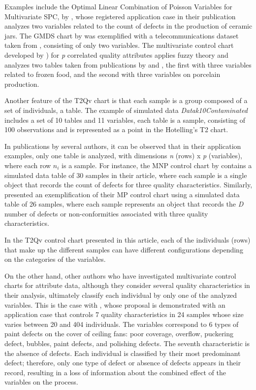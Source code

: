 \documentclass[mathematics,article,submit,moreauthors,pdftex]{mdpi}
\begin{document}
Examples include the Optimal Linear Combination of Poisson Variables for
Multivariate SPC, by \citet{epprecht2013optimal}, whose registered
application case in their publication analyzes two variables related to
the count of defects in the production of ceramic jars. The GMDS chart
by \citet{raza2019design} was exemplified with a telecommunications
dataset taken from \citet{jiang2002process}, consisting of only two
variables. The multivariate control chart developed by
\citet{pastuizaca2015multivariate}) for \emph{p} correlated quality
attributes applies fuzzy theory and analyzes two tables taken from
publications by \citet{taleb2009control} and
\citet{taleb2006multivariate}, the first with three variables related to
frozen food, and the second with three variables on porcelain
production.

Another feature of the T2Qv chart is that each sample is a group
composed of a set of individuals, a table. The example of simulated data
\emph{Datak10Contaminated} includes a set of 10 tables and 11 variables,
each table is a sample, consisting of 100 observations and is
represented as a point in the Hotelling's T2 chart.

In publications by several authors, it can be observed that in their
application examples, only one table is analyzed, with dimensions
\emph{n} (rows) x \emph{p} (variables), where each row \(n_i\) is a
sample. For instance, the MNP control chart by \citet{lu1998control}
contains a simulated data table of 30 samples in their article, where
each sample is a single object that records the count of defects for
three quality characteristics. Similarly, \citet{chiu2007} presented an
exemplification of their MP control chart using a simulated data table
of 26 samples, where each sample represents an object that records the
\emph{D} number of defects or non-conformities associated with three
quality characteristics.

In the T2Qv control chart presented in this article, each of the
individuals (rows) that make up the different samples can have different
configurations depending on the categories of the variables.

On the other hand, other authors who have investigated multivariate
control charts for attribute data, although they consider several
quality characteristics in their analysis, ultimately classify each
individual by only one of the analyzed variables. This is the case with
\citet{ranjan2008multivariate}, whose proposal is demonstrated with an
application case that controls 7 quality characteristics in 24 samples
whose size varies between 20 and 404 individuals. The variables
correspond to 6 types of paint defects on the cover of ceiling fans:
poor coverage, overflow, puckering defect, bubbles, paint defects, and
polishing defects. The seventh characteristic is the absence of defects.
Each individual is classified by their most predominant defect;
therefore, only one type of defect or absence of defects appears in
their record, resulting in a loss of information about the combined
effect of the variables on the process.
\end{document}
